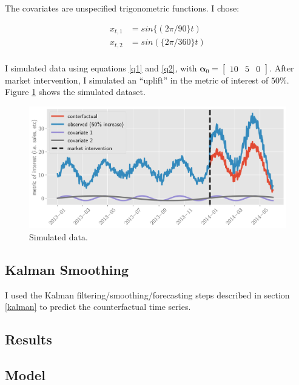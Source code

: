 \documentclass[12pt]{article}
\begin{document}
The covariates are unspecified trigonometric functions. I chose:

\begin{align*}
    x_{t, 1} &= sin\{(2\pi/90\}  t) \\
x_{t, 2} &= sin(\{2\pi/360\}  t)\\
\end{align*}

I simulated data using equations \ref{q1} and \ref{q2}, with $\boldsymbol{\alpha}_0 = \begin{bmatrix} 10 &5 & 0
\end{bmatrix} $. After market intervention, I simulated an ``uplift'' in the metric of interest of $50\%$. Figure \ref{data} shows the simulated dataset. 


\begin{figure}[!h]
    \centering
    \includegraphics[scale=.6
    ]{../figures/data.png}
    \caption{Simulated data.}
    \label{data}
\end{figure}




\subsection{Kalman Smoothing}
I used the Kalman filtering/smoothing/forecasting steps described in section \ref{kalman} to predict the counterfactual time series. 

\subsection{Results}

\subsection{Model}



 

\end{document}
